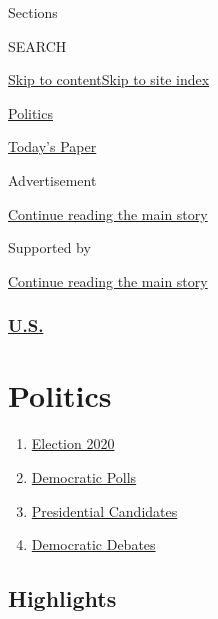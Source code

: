 Sections

SEARCH

\protect\hyperlink{site-content}{Skip to
content}\protect\hyperlink{site-index}{Skip to site index}

\href{https://www.nytimes3xbfgragh.onion/section/politics}{Politics}

\href{https://myaccount.nytimes3xbfgragh.onion/auth/login?response_type=cookie\&client_id=vi}{}

\href{https://www.nytimes3xbfgragh.onion/section/todayspaper}{Today's
Paper}

Advertisement

\protect\hyperlink{after-top}{Continue reading the main story}

Supported by

\protect\hyperlink{after-sponsor}{Continue reading the main story}

\hypertarget{us}{%
\subsubsection{\texorpdfstring{\href{/section/us}{U.S.}}{U.S.}}\label{us}}

\hypertarget{politics}{%
\section{Politics}\label{politics}}

\begin{enumerate}
\def\labelenumi{\arabic{enumi}.}
\tightlist
\item
  \href{https://www.nytimes3xbfgragh.onion/news-event/2020-election}{Election
  2020}
\item
  \href{https://www.nytimes3xbfgragh.onion/interactive/2020/us/elections/democratic-polls.html}{Democratic
  Polls}
\item
  \href{https://www.nytimes3xbfgragh.onion/interactive/2019/us/politics/2020-presidential-candidates.html}{Presidential
  Candidates}
\item
  \href{https://www.nytimes3xbfgragh.onion/news-event/democratic-debates}{Democratic
  Debates}
\end{enumerate}

\hypertarget{highlights}{%
\subsection{Highlights}\label{highlights}}

